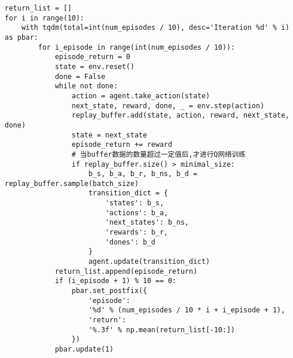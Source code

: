 \begin{lstlisting}
return_list = []
for i in range(10):
    with tqdm(total=int(num_episodes / 10), desc='Iteration %d' % i) as pbar:
        for i_episode in range(int(num_episodes / 10)):
            episode_return = 0
            state = env.reset()
            done = False
            while not done:
                action = agent.take_action(state)
                next_state, reward, done, _ = env.step(action)
                replay_buffer.add(state, action, reward, next_state, done)
                state = next_state
                episode_return += reward
                # 当buffer数据的数量超过一定值后,才进行Q网络训练
                if replay_buffer.size() > minimal_size:
                    b_s, b_a, b_r, b_ns, b_d = replay_buffer.sample(batch_size)
                    transition_dict = {
                        'states': b_s,
                        'actions': b_a,
                        'next_states': b_ns,
                        'rewards': b_r,
                        'dones': b_d
                    }
                    agent.update(transition_dict)
            return_list.append(episode_return)
            if (i_episode + 1) % 10 == 0:
                pbar.set_postfix({
                    'episode':
                    '%d' % (num_episodes / 10 * i + i_episode + 1),
                    'return':
                    '%.3f' % np.mean(return_list[-10:])
                })
            pbar.update(1)
\end{lstlisting}

